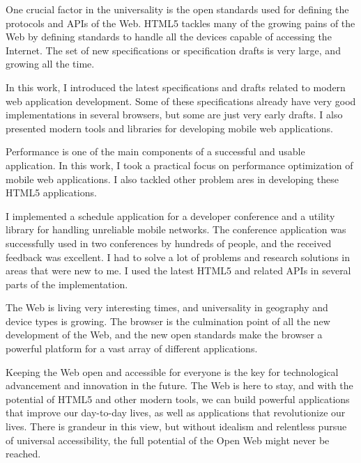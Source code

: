 One crucial factor in the universality is the open standards used for
defining the protocols and APIs of the Web. HTML5 tackles many of the
growing pains of the Web by defining standards to handle all the
devices capable of accessing the Internet. The set of new
specifications or specification drafts is very large, and growing all
the time.

In this work, I introduced the latest specifications and drafts
related to modern web application development. Some of these
specifications already have very good implementations in several
browsers, but some are just very early drafts. I also presented modern
tools and libraries for developing mobile web applications.

Performance is one of the main components of a successful and usable
application. In this work, I took a practical focus on performance
optimization of mobile web applications. I also tackled other problem
ares in developing these HTML5 applications.

I implemented a schedule application for a developer conference and a
utility library for handling unreliable mobile networks. The
conference application was successfully used in two conferences by
hundreds of people, and the received feedback was excellent. I had to
solve a lot of problems and research solutions in areas that were new
to me. I used the latest HTML5 and related APIs in several parts of
the implementation.

The Web is living very interesting times, and universality in
geography and device types is growing. The browser is the culmination
point of all the new development of the Web, and the new open
standards make the browser a powerful platform for a vast array of
different applications.

Keeping the Web open and accessible for everyone is the key for
technological advancement and innovation in the future. The Web is
here to stay, and with the potential of HTML5 and other modern tools,
we can build powerful applications that improve our day-to-day lives,
as well as applications that revolutionize our lives. There is
grandeur in this view, but without idealism and relentless pursue of
universal accessibility, the full potential of the Open Web might
never be reached.
